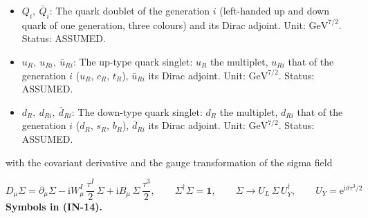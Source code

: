 \documentclass[
  10pt,
]{article}
\begin{document}
\begin{itemize}
  \(\mu_R\), \(\tau_R\)). Unit: \(\mathrm{GeV}^{7/2}\). Status: ASSUMED.
\item
  \(Q_i,\ \bar Q_i\): The quark doublet of the generation \(i\)
  (left-handed up and down quark of one generation, three colours) and
  its Dirac adjoint. Unit: \(\mathrm{GeV}^{7/2}\). Status: ASSUMED.
\item
  \(u_R,\ u_{Ri},\ \bar u_{Ri}\): The up-type quark singlet: \(u_R\) the
  multiplet, \(u_{Ri}\) that of the generation \(i\) (\(u_R\), \(c_R\),
  \(t_R\)), \(\bar u_{Ri}\) its Dirac adjoint. Unit:
  \(\mathrm{GeV}^{7/2}\). Status: ASSUMED.
\item
  \(d_R,\ d_{Ri},\ \bar d_{Ri}\): The down-type quark singlet: \(d_R\)
  the multiplet, \(d_{Ri}\) that of the generation \(i\) (\(d_R\),
  \(s_R\), \(b_R\)), \(\bar d_{Ri}\) its Dirac adjoint. Unit:
  \(\mathrm{GeV}^{7/2}\). Status: ASSUMED.
\end{itemize}

with the covariant derivative and the gauge transformation of the sigma
field

\[
D_\mu\Sigma = \partial_\mu\Sigma - \mathrm{i}W^I_\mu\,\frac{\tau^I}{2}\,\Sigma +
 \mathrm{i}B_\mu\,\Sigma\,\frac{\tau^3}{2},\qquad
\Sigma^\dagger\Sigma = \mathbf{1},\qquad \Sigma \to U_L\,\Sigma\,U_Y^\dagger,\qquad
U_Y = \mathrm{e}^{\mathrm{i}\vartheta\tau^3/2} \tag{IN-14}
\] \textbf{Symbols in (IN-14).}
\end{document}
